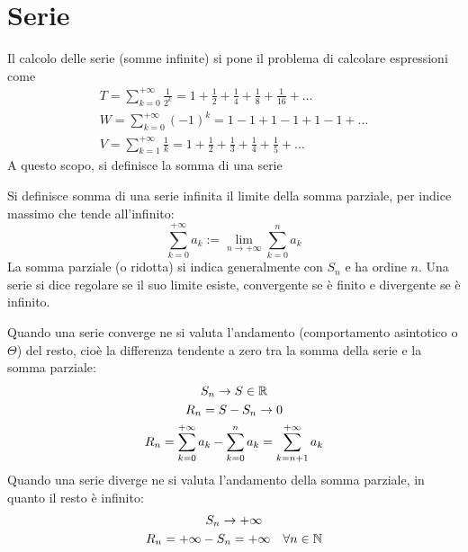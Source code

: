 %
%
%
%


\section{Serie}
Il calcolo delle serie (somme infinite) si pone il problema di calcolare espressioni come
\begin{gather}
	\label{serie:T}
	T=\sum_{k=0}^{+\infty}\frac{1}{2^k}=1+\frac{1}{2}+\frac{1}{4}+\frac{1}{8}+\frac{1}{16}+\dots\\
	\label{serie:W}
	W=\sum_{k=0}^{+\infty}(-1)^k=1-1+1-1+1-1+\dots\\
	\label{serie:V}
	V=\sum_{k=1}^{+\infty}\frac{1}{k}=1+\frac{1}{2}+\frac{1}{3}+\frac{1}{4}+\frac{1}{5}+\dots
\end{gather}
A questo scopo, si definisce la somma di una serie
\begin{defin}
	Si definisce somma di una serie infinita il limite della somma parziale, per indice massimo che tende all'infinito:
	\[
		\sum_{k=0}^{+\infty} a_k:=\lim_{n\to+\infty}\sum_{k=0}^n a_k
	\]
	La somma parziale (o ridotta) si indica generalmente con $S_n$ e ha ordine $n$. Una serie si dice regolare se il suo limite esiste, convergente se è finito e divergente se è infinito.
\end{defin}

Quando una serie converge ne si valuta l'andamento (comportamento asintotico o $\Theta$) del resto, cioè la differenza tendente a zero tra la somma della serie e la somma parziale:
\begin{gather*}
	S_n\to S\in\mathbb{R}\\
	R_n=S-S_n\to0\\
	R_n=\sum_{k=0}^{+\infty}a_k-\sum_{k=0}^n a_k=\sum_{k=n+1}^{+\infty} a_k
\end{gather*}
Quando una serie diverge ne si valuta l'andamento della somma parziale, in quanto il resto è infinito:
\begin{gather*}
	S_n\to+\infty\\
	R_n=+\infty-S_n=+\infty\quad\forall n\in\mathbb{N}
\end{gather*}


